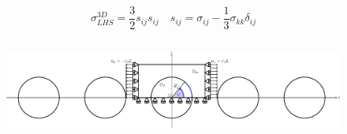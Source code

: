 \documentclass[first,firstsupp,lastsupp,last,hyperref,table]{ETHclass}
\begin{document}
\begin{frame}
\begin{columns}[c]
\begin{column}{0.5\textwidth}
\begin{figure}
\end{figure}
\vspace{-0.3cm}
\scriptsize
\begin{equation*}
\sigma^{3D}_{LHS}=\frac{3}{2}s_{ij}s_{ij}\quad s_{ij}=\sigma_{ij}-\frac{1}{3}\sigma_{kk}\delta_{ij}
\end{equation*}
\end{column}
\end{columns}
\vspace{-0.3cm}
\centering
\begin{figure}
\centering
\includegraphics[width=\textwidth]{refAngle.pdf}
\end{figure}
\end{frame}

\addtocounter{framenumber}{-1}
\end{document}
